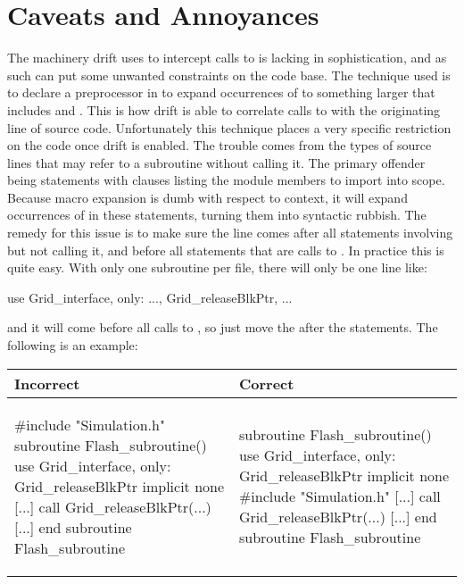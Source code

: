 \section{Caveats and Annoyances}
The machinery drift uses to intercept calls to  is lacking in
sophistication, and as such can put some unwanted constraints on the code base.
The technique used is to declare a preprocessor  in 
to expand occurrences of  to something larger that includes
 and .  This is how drift is able to
correlate calls to  with the originating line of
source code.  Unfortunately this technique places a very specific restriction on the
code once drift is enabled.  The trouble comes from the types of source lines that
may refer to a subroutine without calling it.  The primary offender being 
statements with  clauses listing the module members to import into scope.
Because macro expansion is dumb with respect to context, it will expand occurrences
of  in these  statements, turning them into
syntactic rubbish.  The remedy for this issue is to make sure the line
 comes after all statements involving
 but not calling it, and before all statements that
are calls to .  In practice this is quite easy.  With
only one subroutine per file, there will only be one line like:
\begin{codeseg}
use Grid\_interface, only: ..., Grid\_releaseBlkPtr, ...
\end{codeseg}
and it will come before all calls to , so just move
the  after the  statements.  The following is an example:

\vspace{0.1 in}

\begin{tabular}{|p{}|p{}|}
\hline
Incorrect & Correct \\
\hline
\begin{scriptsize}
\begin{codeseg}
#include "Simulation.h"
subroutine Flash_subroutine()
  use Grid_interface, only: Grid_releaseBlkPtr
  implicit none
  [...]
  call Grid_releaseBlkPtr(...)
  [...]
end subroutine Flash_subroutine
\end{codeseg}
\end{scriptsize}
&
\begin{scriptsize}
\begin{codeseg}
subroutine Flash_subroutine()
  use Grid_interface, only: Grid_releaseBlkPtr
  implicit none
#include "Simulation.h"
  [...]
  call Grid_releaseBlkPtr(...)
  [...]
end subroutine Flash_subroutine
\end{codeseg}
\end{scriptsize}
\\
\hline
\end{tabular}

